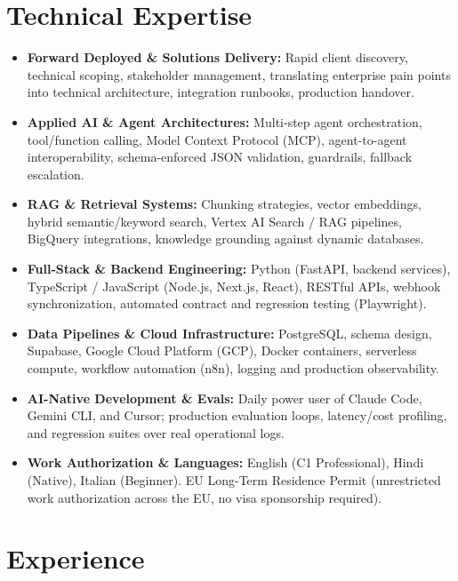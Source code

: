 \documentclass[10pt,a4paper]{article}
\begin{document}
\section{Technical Expertise}
\begin{itemize}
  \item \textbf{Forward Deployed \& Solutions Delivery:} Rapid client discovery, technical scoping, stakeholder management, translating enterprise pain points into technical architecture, integration runbooks, production handover.
  \item \textbf{Applied AI \& Agent Architectures:} Multi-step agent orchestration, tool/function calling, Model Context Protocol (MCP), agent-to-agent interoperability, schema-enforced JSON validation, guardrails, fallback escalation.
  \item \textbf{RAG \& Retrieval Systems:} Chunking strategies, vector embeddings, hybrid semantic/keyword search, Vertex AI Search / RAG pipelines, BigQuery integrations, knowledge grounding against dynamic databases.
  \item \textbf{Full-Stack \& Backend Engineering:} Python (FastAPI, backend services), TypeScript / JavaScript (Node.js, Next.js, React), RESTful APIs, webhook synchronization, automated contract and regression testing (Playwright).
  \item \textbf{Data Pipelines \& Cloud Infrastructure:} PostgreSQL, schema design, Supabase, Google Cloud Platform (GCP), Docker containers, serverless compute, workflow automation (n8n), logging and production observability.
  \item \textbf{AI-Native Development \& Evals:} Daily power user of Claude Code, Gemini CLI, and Cursor; production evaluation loops, latency/cost profiling, and regression suites over real operational logs.
  \item \textbf{Work Authorization \& Languages:} English (C1 Professional), Hindi (Native), Italian (Beginner). EU Long-Term Residence Permit (unrestricted work authorization across the EU, no visa sponsorship required).
\end{itemize}

\section{Experience}
\end{document}
